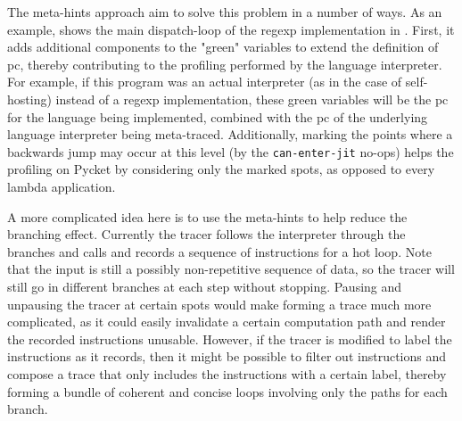 The meta-hints approach aim to solve this problem in a number of
ways. As an example,  shows the main
dispatch-loop of the regexp implementation in
. First, it adds additional components to the
"green" variables to extend the definition of pc, thereby contributing
to the profiling performed by the language interpreter. For example,
if this program was an actual interpreter (as in the case of
self-hosting) instead of a regexp implementation, these green
variables will be the pc for the language being implemented, combined
with the pc of the underlying language interpreter being
meta-traced. Additionally, marking the points where a backwards jump
may occur at this level (by the \verb|can-enter-jit| no-ops) helps the
profiling on Pycket by considering only the marked spots, as opposed
to every lambda application.

A more complicated idea here is to use the meta-hints to help reduce
the branching effect. Currently the tracer follows the interpreter
through the branches and calls and records a sequence of instructions
for a hot loop. Note that the input is still a possibly non-repetitive
sequence of data, so the tracer will still go in different branches at
each step without stopping. Pausing and unpausing the tracer at
certain spots would make forming a trace much more complicated, as it
could easily invalidate a certain computation path and render the
recorded instructions unusable. However, if the tracer is modified to
label the instructions as it records, then it might be possible to
filter out instructions and compose a trace that only includes the
instructions with a certain label, thereby forming a bundle of
coherent and concise loops involving only the paths for each branch.

